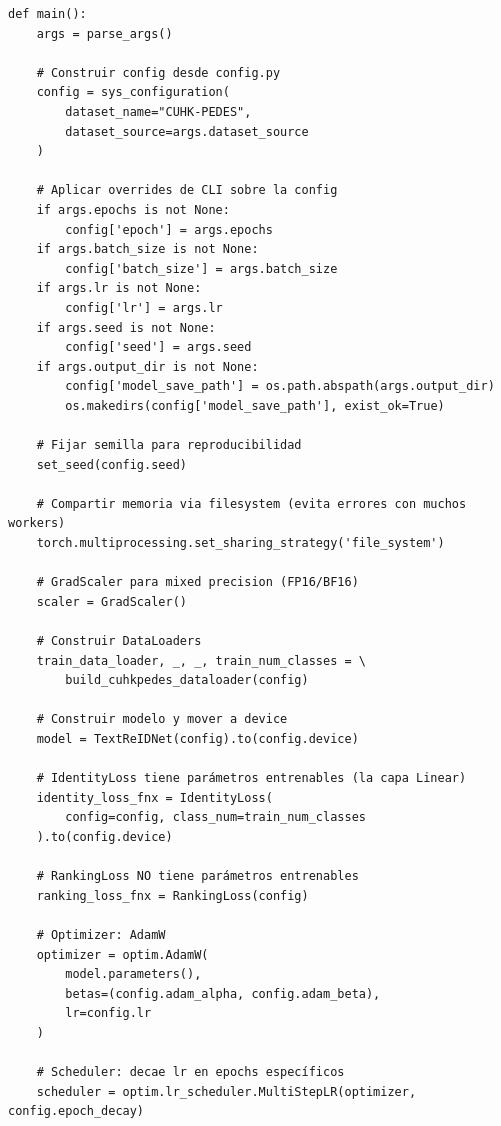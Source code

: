 \begin{verbatim}
def main():
    args = parse_args()

    # Construir config desde config.py
    config = sys_configuration(
        dataset_name="CUHK-PEDES",
        dataset_source=args.dataset_source
    )

    # Aplicar overrides de CLI sobre la config
    if args.epochs is not None:
        config['epoch'] = args.epochs
    if args.batch_size is not None:
        config['batch_size'] = args.batch_size
    if args.lr is not None:
        config['lr'] = args.lr
    if args.seed is not None:
        config['seed'] = args.seed
    if args.output_dir is not None:
        config['model_save_path'] = os.path.abspath(args.output_dir)
        os.makedirs(config['model_save_path'], exist_ok=True)

    # Fijar semilla para reproducibilidad
    set_seed(config.seed)

    # Compartir memoria via filesystem (evita errores con muchos workers)
    torch.multiprocessing.set_sharing_strategy('file_system')

    # GradScaler para mixed precision (FP16/BF16)
    scaler = GradScaler()

    # Construir DataLoaders
    train_data_loader, _, _, train_num_classes = \
        build_cuhkpedes_dataloader(config)

    # Construir modelo y mover a device
    model = TextReIDNet(config).to(config.device)

    # IdentityLoss tiene parámetros entrenables (la capa Linear)
    identity_loss_fnx = IdentityLoss(
        config=config, class_num=train_num_classes
    ).to(config.device)

    # RankingLoss NO tiene parámetros entrenables
    ranking_loss_fnx = RankingLoss(config)

    # Optimizer: AdamW
    optimizer = optim.AdamW(
        model.parameters(),
        betas=(config.adam_alpha, config.adam_beta),
        lr=config.lr
    )

    # Scheduler: decae lr en epochs específicos
    scheduler = optim.lr_scheduler.MultiStepLR(optimizer, config.epoch_decay)
\end{verbatim}

